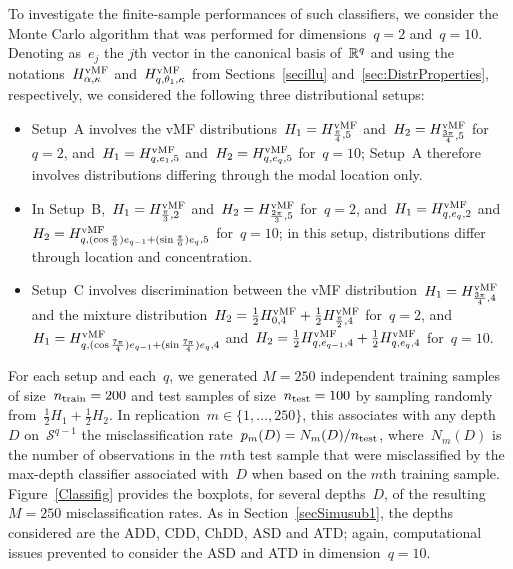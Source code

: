 \documentclass[usenames,dvipsnames]{article}
\begin{document}
To investigate the finite-sample performances of such classifiers, we consider the Monte Carlo algorithm that was performed for dimensions~$q=2$ and~$q=10$. Denoting as~$e_j$ the $j$th vector in the canonical basis of~$\mathbb{R}^q$ and using the notations~$H^{\rm vMF}_{\alpha,\kappa}$ and~$H^{\rm vMF}_{q,\theta_1,\kappa}$ from Sections~\ref{secillu} and~\ref{sec:DistrProperties}, respectively, we considered the following three distributional setups:
\begin{itemize}
	\item Setup~A involves the vMF distributions~$H_1=H^{\rm vMF}_{\frac{\pi}{4},5}$ and~$H_2=H^{\rm vMF}_{\frac{3\pi}{4},5}$ for~$q=2$, and~$H_1=H^{\rm vMF}_{q,e_1,5}$ and~$H_2=H^{\rm vMF}_{q,e_q,5}$ for~$q=10$; Setup~A therefore involves distributions differing through the modal location only.
%
	\item In Setup~B,~$H_1=H^{\rm vMF}_{\frac{\pi}{3},2}$ and~$H_2=H^{\rm vMF}_{\frac{2\pi}{3},5}$ for~$q=2$, and~$H_1=H^{\rm vMF}_{q,e_q,2}$ and~$H_2=H^{\rm vMF}_{q,(\cos \frac{\pi}{6})e_{q-1}+(\sin \frac{\pi}{6})e_q,5}$ for~$q=10$; in this setup, distributions differ through location and concentration. 
%
	\item Setup~C involves discrimination between the vMF distribution~$H_1=H^{\rm vMF}_{\frac{3\pi}{4},4}$ and the mixture distribution~$H_2=\frac{1}{2}H^{\rm vMF}_{0,4}+\frac{1}{2}H^{\rm vMF}_{\frac{\pi}{2},4}$ for~$q=2$, and~$H_1=H^{\rm vMF}_{q,(\cos \frac{7\pi}{4})e_{q-1}+(\sin \frac{7\pi}{4})e_q,4}$ and~$H_2=\frac{1}{2}H^{\rm vMF}_{q,e_{q-1},4}+\frac{1}{2}H^{\rm vMF}_{q,e_q,4}$ for~$q=10$. 
\end{itemize}  
For each setup and each~$q$, we generated $M=250$ independent training samples of size~$n_{\rm train}=200$ and test samples of size~$n_{\rm test}=100$ by sampling randomly from~$\frac{1}{2}H_1+\frac{1}{2}H_2$. In replication~$m \in \{1,\ldots,250\}$, this associates with any depth~$D$ on~$\mathcal{S}^{q-1}$ the misclassification rate~$p_m(D)=N_m(D)/n_{\rm test}$, where~$N_m(D)$ is the number of observations in the $m$th test sample that were misclassified by the max-depth classifier associated with~$D$ when based on the $m$th training sample. Figure~\ref{Classifig} provides the boxplots, for several depths~$D$, of the resulting~$M=250$ misclassification rates. As in Section~\ref{secSimusub1}, the depths considered are the ADD, CDD, ChDD, ASD and ATD; again, computational issues prevented to consider the ASD and ATD in dimension~$q=10$.  
\end{document}

